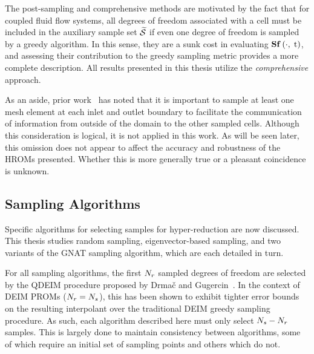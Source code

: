The post-sampling and comprehensive methods are motivated by the fact that for coupled fluid flow systems, all degrees of freedom associated with a cell must be included in the auxiliary sample set $\mathcal{\widetilde{S}}$ if even one degree of freedom is sampled by a greedy algorithm. In this sense, they are a sunk cost in evaluating $\mathbf{S} \mathbf{f} \left(\cdot, \; \text{t}\right)$, and assessing their contribution to the greedy sampling metric provides a more complete description. All results presented in this thesis utilize the \textit{comprehensive} approach.

As an aside, prior work~\cite{Carlberg2013} has noted that it is important to sample at least one mesh element at each inlet and outlet boundary to facilitate the communication of information from outside of the domain to the other sampled cells. Although this consideration is logical, it is not applied in this work. As will be seen later, this omission does not appear to affect the accuracy and robustness of the HROMs presented. Whether this is more generally true or a pleasant coincidence is unknown.

\subsection{Sampling Algorithms}\label{subsec:sampAlgos}
%
Specific algorithms for selecting samples for hyper-reduction are now discussed. This thesis studies random sampling, eigenvector-based sampling, and two variants of the GNAT sampling algorithm, which are each detailed in turn.

For all sampling algorithms, the first $N_r$ sampled degrees of freedom are selected by the QDEIM procedure proposed by Drma\v{c} and Gugercin~\cite{Drmac2016}. In the context of DEIM PROMs ($N_r = N_s$), this has been shown to exhibit tighter error bounds on the resulting interpolant over the traditional DEIM greedy sampling procedure. As such, each algorithm described here must only select $N_s - N_r$ samples. This is largely done to maintain consistency between algorithms, some of which require an initial set of sampling points and others which do not.

